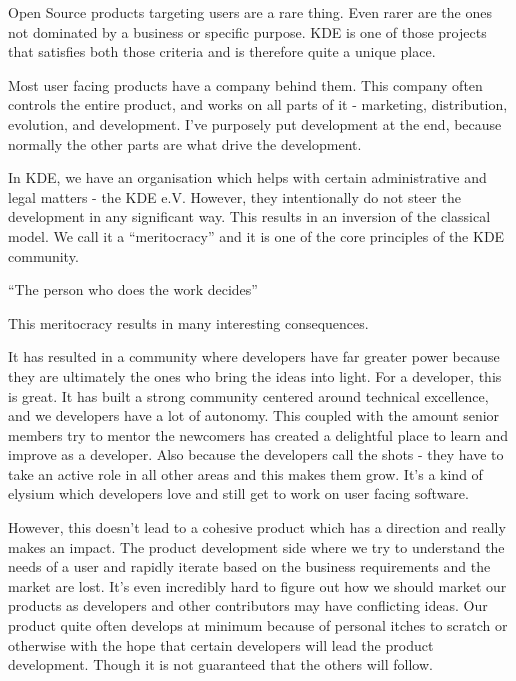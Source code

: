 


\noindent{}Open Source products targeting users are a rare thing. Even rarer are the ones not dominated by a business or specific purpose. KDE is one of those projects that satisfies both those criteria and is therefore quite a unique place.

Most user facing products have a company behind them. This company often controls the entire product, and works on all parts of it - marketing, distribution, evolution, and development. I’ve purposely put development at the end, because normally the other parts are what drive the development.

In KDE, we have an organisation which helps with certain administrative and legal matters - the KDE e.V. However, they intentionally do not steer the development in any significant way. This results in an inversion of the classical model. We call it a “meritocracy” and it is one of the core principles of the KDE community.

“The person who does the work decides”

This meritocracy results in many interesting consequences.

It has resulted in a community where developers have far greater power because they are ultimately the ones who bring the ideas into light. For a developer, this is great. It has built a strong community centered around technical excellence, and we developers have a lot of autonomy. This coupled with the amount senior members try to mentor the newcomers has created a delightful place to learn and improve as a developer. Also because the developers call the shots - they have to take an active role in all other areas and this makes them grow. It’s a kind of elysium which developers love and still get to work on user facing software.

However, this doesn’t lead to a cohesive product which has a direction and really makes an impact. The product development side where we try to understand the needs of a user and rapidly iterate based on the business requirements and the market are lost. It’s even incredibly hard to figure out how we should market our products as developers and other contributors may have conflicting ideas. Our product quite often develops at minimum because of personal itches to scratch or otherwise with the hope that certain developers will lead the product development. Though it is not guaranteed that the others will follow.

